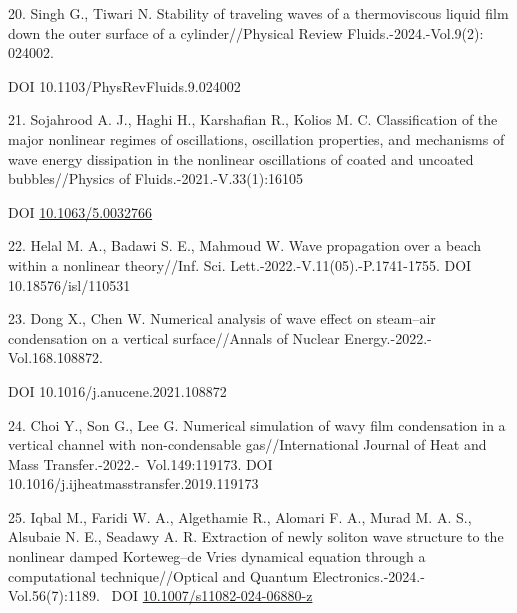 \begin{references}
20. Singh G., Tiwari N. Stability of traveling waves of a thermoviscous
liquid film down the outer surface of a cylinder//Physical Review
Fluids.-2024.-Vol.9(2): 024002.

DOI 10.1103/PhysRevFluids.9.024002

21. Sojahrood A. J., Haghi H., Karshafian R., Kolios M. C. Classification
of the major nonlinear regimes of oscillations, oscillation properties,
and mechanisms of wave energy dissipation in the nonlinear oscillations
of coated and uncoated bubbles//Physics of Fluids.-2021.-V.33(1):16105

DOI \href{http://dx.doi.org/10.1063/5.0032766}{10.1063/5.0032766}

22. Helal M. A., Badawi S. E., Mahmoud W. Wave propagation over a beach
within a nonlinear theory//Inf. Sci. Lett.-2022.-V.11(05).-P.1741-1755.
DOI 10.18576/isl/110531

23. Dong X., Chen W. Numerical analysis of wave effect on steam--air
condensation on a vertical surface//Annals of Nuclear
Energy.-2022.-Vol.168.108872.

DOI 10.1016/j.anucene.2021.108872

24. Choi Y., Son G., Lee G. Numerical simulation of wavy film
condensation in a vertical channel with non-condensable
gas//International Journal of Heat and Mass
Transfer.-2022.-~Vol.149:119173. DOI
10.1016/j.ijheatmasstransfer.2019.119173

25. Iqbal M., Faridi W. A., Algethamie R., Alomari F. A., Murad M. A. S.,
Alsubaie N. E., Seadawy A. R. Extraction of newly soliton wave structure
to the nonlinear damped Korteweg--de Vries dynamical equation through a
computational technique//Optical and Quantum
Electronics.-2024.-Vol.56(7):1189. ~DOI
\href{https://ui.adsabs.harvard.edu/link_gateway/2024OQEle..56.1189I/doi:10.1007/s11082-024-06880-z}{10.1007/s11082-024-06880-z}~
\end{references}

